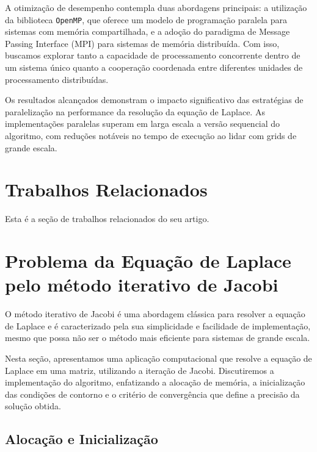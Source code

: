 \documentclass[conference]{IEEEtran}
\begin{document}
A otimização de desempenho contempla duas abordagens principais: a utilização da biblioteca \texttt{OpenMP}, que oferece um modelo de programação paralela para sistemas com memória compartilhada, e a adoção do paradigma de Message Passing Interface (MPI) para sistemas de memória distribuída. Com isso, buscamos explorar tanto a capacidade de processamento concorrente dentro de um sistema único quanto a cooperação coordenada entre diferentes unidades de processamento distribuídas.

Os resultados alcançados demonstram o impacto significativo das estratégias de paralelização na performance da resolução da equação de Laplace. As implementações paralelas superam em larga escala a versão sequencial do algoritmo, com reduções notáveis no tempo de execução ao lidar com grids de grande escala.

\section{Trabalhos Relacionados}

Esta é a seção de trabalhos relacionados do seu artigo.


\section{Problema da Equação de Laplace pelo método iterativo de Jacobi}


O método iterativo de Jacobi é uma abordagem clássica para resolver a equação de Laplace e é caracterizado pela sua simplicidade e facilidade de implementação, mesmo que possa não ser o método mais eficiente para sistemas de grande escala.

Nesta seção, apresentamos uma aplicação computacional que resolve a equação de Laplace em uma matriz, utilizando a iteração de Jacobi. Discutiremos a implementação do algoritmo, enfatizando a alocação de memória, a inicialização das condições de contorno e o critério de convergência que define a precisão da solução obtida.

\subsection{Alocação e Inicialização}
\end{document}
